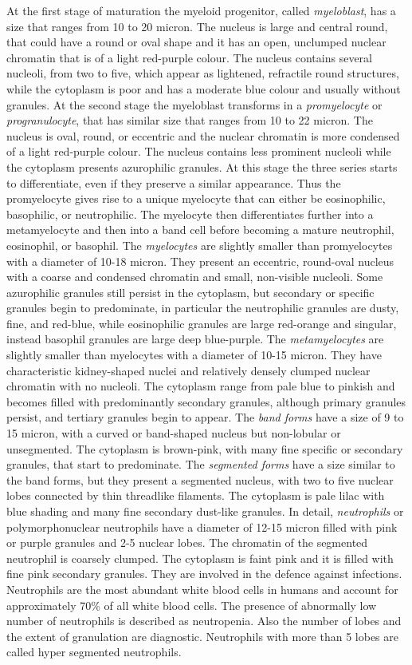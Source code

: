 \documentclass[final,a4paper,12pt,english]{UnicaPhdThesis3}
\begin{document}
At the first stage of maturation the myeloid progenitor, called \textit{myeloblast}, has a size that ranges from 10 to 20 micron. The nucleus is large and central round, that could have a round or oval shape and it has an open, unclumped nuclear chromatin that is of a light red-purple colour. The nucleus contains several nucleoli, from two to five, which appear as lightened, refractile round structures, while the cytoplasm is poor and has a moderate blue colour and usually without granules. At the second stage the myeloblast transforms in a \textit{promyelocyte} or \textit{progranulocyte}, that has similar size that ranges from 10 to 22 micron. The nucleus is oval, round, or eccentric and the nuclear chromatin is more condensed of a light red-purple colour. The nucleus contains less prominent nucleoli while the cytoplasm presents azurophilic granules. At this stage the three series starts to differentiate, even if they preserve a similar appearance. Thus the promyelocyte gives rise to a unique myelocyte that can either be eosinophilic, basophilic, or neutrophilic. The myelocyte then differentiates further into a metamyelocyte and then into a band cell before becoming a mature neutrophil, eosinophil, or basophil. The \textit{myelocytes} are slightly smaller than promyelocytes with a diameter of 10-18 micron. They present an eccentric, round-oval nucleus with a coarse and condensed chromatin and small, non-visible nucleoli. Some azurophilic granules still persist in the cytoplasm, but secondary or specific granules begin to predominate, in particular the neutrophilic granules are dusty, fine, and red-blue, while eosinophilic granules are large red-orange and singular, instead basophil granules are large deep blue-purple. The \textit{metamyelocytes} are slightly smaller than myelocytes with a diameter of  10-15 micron. They have characteristic kidney-shaped nuclei and relatively densely clumped nuclear chromatin with no nucleoli. The cytoplasm range from pale blue to pinkish and becomes filled with predominantly secondary granules, although primary granules persist, and tertiary granules begin to appear. The \textit{band forms} have a size of 9 to 15 micron, with a curved or band-shaped nucleus but non-lobular or unsegmented. The cytoplasm is brown-pink, with many fine specific or secondary granules, that start to predominate. The \textit{segmented forms} have a size similar to the band forms, but they present a segmented nucleus, with two to five nuclear lobes connected by thin threadlike filaments. The cytoplasm is pale lilac with blue shading and many fine secondary dust-like granules. In detail, \textit{neutrophils} or polymorphonuclear neutrophils have a diameter of 12-15 micron filled with pink or purple granules and 2-5 nuclear lobes. The chromatin of the segmented neutrophil is coarsely clumped. The cytoplasm is faint pink and it is filled with fine pink secondary granules. They are involved in the defence against infections. Neutrophils are the most abundant white blood cells in humans and account for approximately 70\% of all white blood cells. The presence of abnormally low number of neutrophils is described as neutropenia. Also the number of lobes and the extent of granulation are diagnostic. Neutrophils with more than 5 lobes are called hyper segmented neutrophils. 
\end{document}
